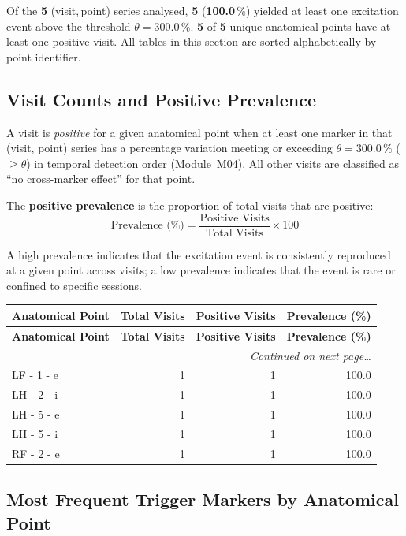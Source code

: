 \documentclass[a4paper,11pt]{article}
\begin{document}
\noindent
Of the \textbf{5} (visit,\,point) series analysed,
\textbf{5} (\textbf{100.0}\,\%) yielded at least one
excitation event above the threshold $\theta = 300.0\,\%$.
\textbf{5} of \textbf{5} unique anatomical points
have at least one positive visit.
All tables in this section are sorted alphabetically by point identifier.

\subsection{Visit Counts and Positive Prevalence}

A visit is \emph{positive} for a given anatomical point when at least one marker in that
(visit, point) series has a percentage variation meeting or exceeding
$\theta = 300.0\,\%$ ($\geq \theta$) in temporal detection order (Module~M04).
All other visits are classified as ``no cross-marker effect'' for that point.

The \textbf{positive prevalence} is the proportion of total visits that are positive:
\[
  \text{Prevalence (\%)} = \frac{\text{Positive Visits}}{\text{Total Visits}} \times 100
\]

A high prevalence indicates that the excitation event is consistently reproduced at a given
point across visits; a low prevalence indicates that the event is rare or confined to
specific sessions.

\begin{small}
\begin{longtable}{p{5cm}rrr}
\toprule
\textbf{Anatomical Point} &
\textbf{Total Visits} &
\textbf{Positive Visits} &
\textbf{Prevalence (\%)} \\
\midrule
\endfirsthead
\toprule
\textbf{Anatomical Point} &
\textbf{Total Visits} &
\textbf{Positive Visits} &
\textbf{Prevalence (\%)} \\
\midrule
\endhead
\midrule
\multicolumn{4}{r}{\small\emph{Continued on next page\ldots}} \\
\endfoot
\bottomrule
\endlastfoot
LF - 1 - e & 1 & 1 & 100.0 \\
LH - 2 - i & 1 & 1 & 100.0 \\
LH - 5 - e & 1 & 1 & 100.0 \\
LH - 5 - i & 1 & 1 & 100.0 \\
RF - 2 - e & 1 & 1 & 100.0 \\
\end{longtable}
\end{small}

\subsection{Most Frequent Trigger Markers by Anatomical Point}
\end{document}
